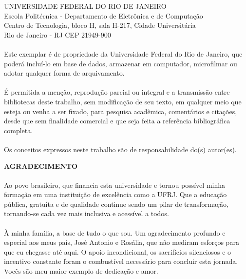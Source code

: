 \pagebreak

      \vspace{0.5cm}

UNIVERSIDADE FEDERAL DO RIO DE JANEIRO \\
Escola Politécnica - Departamento de Eletrônica e de Computação \\
Centro de Tecnologia, bloco H, sala H-217, Cidade Universitária \\ 
Rio de Janeiro - RJ      CEP 21949-900\\
\vspace{0.5cm}
\paragraph{}Este exemplar é de propriedade da Universidade Federal do Rio de Janeiro, que poderá incluí-lo em base de dados, armazenar em computador, microfilmar ou adotar qualquer forma de arquivamento.
\paragraph{}É permitida a menção, reprodução parcial ou integral e a transmissão entre bibliotecas deste trabalho, sem modificação de seu texto, em qualquer meio que esteja ou venha a ser fixado, para pesquisa acadêmica, comentários e citações, desde que sem finalidade comercial e que seja feita a referência bibliográfica completa.
\paragraph{}Os conceitos expressos neste trabalho são de responsabilidade do(s) autor(es).


\pagebreak


\begin{center}
\textbf{AGRADECIMENTO}
\end{center}
      \vspace{0.5cm}

\paragraph{}Ao povo brasileiro, que financia esta universidade e tornou possível minha formação em uma instituição de excelência como a UFRJ. Que a educação pública, gratuita e de qualidade continue sendo um pilar de transformação, tornando-se cada vez mais inclusiva e acessível a todos.

\paragraph{}À minha família, a base de tudo o que sou. Um agradecimento profundo e especial aos meus pais, José Antonio e Rosália, que não mediram esforços para que eu chegasse até aqui. O apoio incondicional, os sacrifícios silenciosos e o incentivo constante foram o combustível necessário para concluir esta jornada. Vocês são meu maior exemplo de dedicação e amor.

